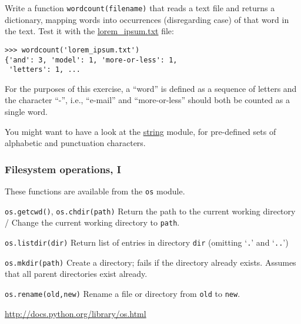\documentclass[english,serif,mathserif,xcolor=pdftex,dvipsnames,table]{beamer}
\begin{document}
\begin{frame}[fragile]
\begin{exercise}
    Write a function \lstinline|wordcount(filename)| that reads a text
    file and returns a dictionary, mapping words into occurrences
    (disregarding case) of that word in the text.  Test it with the
    \href{https://raw.github.com/gc3-uzh-ch/python-course/master/lorem_ipsum.txt}{lorem\_ipsum.txt} file:
    \begin{lstlisting}
>>> wordcount('lorem_ipsum.txt')
{'and': 3, 'model': 1, 'more-or-less': 1,
 'letters': 1, ...
    \end{lstlisting}

    \+ For the purposes of this
    exercise, a ``word'' is defined as a sequence of letters and the
    character ``-'', i.e., ``e-mail'' and ``more-or-less'' should both
    be counted as a single word.

    \+ You might want to have a look at the
    \href{http://docs.python.org/2/library/string.html}{string}
    module, for pre-defined sets of alphabetic and punctuation
    characters.
  \end{exercise}
\end{frame}


\begin{frame}[fragile]
  \frametitle{Filesystem operations, I}
  \small
  These functions are available from the \texttt{os} module.

  \begin{describe}{\lstinline|os.getcwd()|, \lstinline|os.chdir(path)|}
    Return the path to the current working directory /
    Change the current working directory to \texttt{path}.
  \end{describe}

  \begin{describe}{\lstinline|os.listdir(dir)|}
    Return list of entries in directory \texttt{dir} (omitting
    `\texttt{.}' and `\texttt{..}')
  \end{describe}

  \begin{describe}{\lstinline|os.mkdir(path)|}
    Create a directory; fails if the directory already exists.
    Assumes that all parent directories exist already.
  \end{describe}


  \begin{describe}{\lstinline|os.rename(old,new)|}
    Rename a file or directory from \texttt{old} to \texttt{new}.
  \end{describe}

  \begin{references}
    \url{http://docs.python.org/library/os.html}
  \end{references}
\end{frame}
\end{document}
